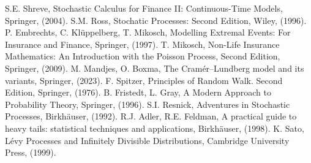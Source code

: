 \documentclass[12pt, a4paper, reqno]{amsart}
\theoremstyle{definition}
\theoremstyle{plain}
\newcommand{\1}{\mathds{1}}
\begin{document}
\begin{thebibliography}{99}
S.E. Shreve, Stochastic Calculus for Finance II: Continuous-Time Models, Springer, (2004).
S.M. Ross, Stochatic Processes: Second Edition, Wiley, (1996).
P. Embrechts, C. Klüppelberg, T. Mikosch, Modelling Extremal Events: For Insurance and Finance, Springer, (1997).
T. Mikosch, Non-Life Insurance Mathematics: An Introduction with the Poisson Process, Second Edition, Springer, (2009).
M. Mandjes, O. Boxma, The Cramér--Lundberg model and its variants, Springer, (2023).
F. Spitzer, Principles of Random Walk. Second Edition, Springer, (1976).
B. Fristedt, L. Gray, A Modern Approach to Probability Theory, Springer, (1996).
S.I. Resnick, Adventures in Stochastic Processes, Birkhäuser, (1992).
R.J. Adler, R.E. Feldman, A practical guide to heavy tails: statistical techniques and applications, Birkhäuser, (1998).
K. Sato, Lévy Processes and Infinitely Divisible Distributions, Cambridge University Press, (1999).
\end{thebibliography}
\end{document}
